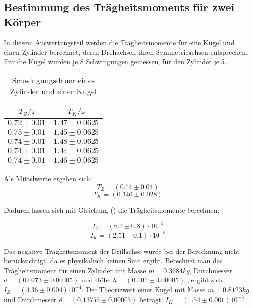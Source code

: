 \subsection{Bestimmung des Trägheitsmoments für zwei Körper}
In diesem Auswertungsteil werden die Trägheitsmomente für eine Kugel und einen 
Zylinder berechnet, deren Drehachsen ihren Symmetrieachsen entsprechen.
Für die Kugel wurden je 8 Schwingungen gemessen, für den Zylinder je 5.
\begin{table}[H]
  \centering
  \caption{Schwingungsdauer eines Zylinder und einer Kugel}
  \label{tab:Schwingungsdauer von Zylinder und Kugel}
  \begin{tabular}{c c}
    \toprule
    $T_Z/$s & $T_K/$s \\
    \midrule
    $0.72 \pm 0.01$ & $1.47\pm 0.0625$ \\
    $0.75 \pm 0.01$ & $1.45\pm 0.0625$ \\
    $0.74 \pm 0.01$ & $1.48\pm 0.0625$ \\
    $0.74 \pm 0.01$ & $1.44\pm 0.0625$ \\
    $0.74 \pm 0.01$ & $1.46\pm 0.0625$ \\
  
    \bottomrule
  \end{tabular}
\end{table}

Als Mittelwerte ergeben sich:
\begin{equation}
T_Z = (0.74 \pm 0.04) 
\end{equation}
\begin{equation}
T_K = (0.146 \pm 0.028) 
\end{equation}



Dadurch lassen sich mit Gleichung () die Trägheitsmomente berechnen:

\begin{equation}
I_Z = (6.4 \pm 0.8)\cdot 10^{-6} 
\end{equation}
\begin{equation}
I_K = (2.51 \pm 0.1)\cdot 10^{-5}
\end{equation}

Das negative Trägheitsmoment der Drillachse wurde bei der Berechnung nicht berücksichtigt,
da es physikalisch keinen Sinn ergibt. 
Berechnet man das Trägheitsmoment für einen Zylinder mit Masse $m = 0.3684 kg$, Durchmesser $d = (0.0973 \pm 0.00005)$
und Höhe $h = (0.101 \pm 0.00005)$ , ergibt sich: $I_Z =(4.36 \pm 0.004)10^{-4} $.
Der Theoriewert einer Kugel mit Masse $ m = 0.8123 kg$ und Durchmesser $ d = (0.13755 \pm 0.00005)$
beträgt: $I_K = (1.54 \pm 0.001)10^{-3} $






